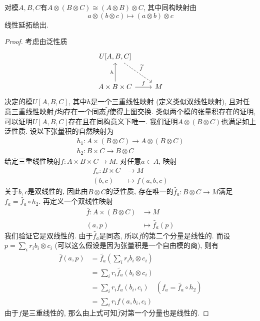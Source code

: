\begin{prop}[结合律]
    对模$A,B,C$有$A\otimes(B\otimes C)\cong(A\otimes B)\otimes C$, 其中同构映射由
    \[a\otimes(b\otimes c)\mapsto (a\otimes b)\otimes c\]
    线性延拓给出.
\end{prop}
\begin{proof}
    考虑由泛性质
    \[\begin{tikzcd}[row sep=large]
        U[A,B,C] \arrow[dr, dashed, "\widetilde{f}"] & \\
        A\times B\times C \arrow[u, "h"] \arrow[r, "f"] & M 
    \end{tikzcd}\]
    决定的模$U[A,B,C]$, 其中$h$是一个三重线性映射 (定义类似双线性映射), 且对任意三重线性映射$f$均存在一个同态$\widetilde{f}$使得上图交换.
    类似两个模的张量积存在的证明, 可以证明$U[A,B,C]$存在且在同构意义下唯一.
    我们证明$A\otimes(B\otimes C)$也满足如上泛性质.
    设以下张量积的自然映射为
    \begin{gather*}
        h_1:A\times(B\otimes C)\to A\otimes(B\otimes C)\\
        h_2:B\times C\to B\otimes C
    \end{gather*}
    给定三重线性映射$f:A\times B\times C\to M$.
    对任意$a\in A$, 映射
    \begin{align*}
        f_a:B\times C&\to M\\
        (b,c)&\mapsto f(a,b,c)
    \end{align*}
    关于$b,c$是双线性的, 因此由$B\otimes C$的泛性质, 存在唯一的$\widetilde{f_a}:B\otimes C\to M$满足$f_a=\widetilde{f_a}\circ h_2$.
    再定义一个双线性映射
    \begin{align*}
        \overline{f}:A\times(B\otimes C)&\to M\\
        (a,p)&\mapsto \widetilde{f_a}(p)
    \end{align*}
    我们验证它是双线性的.
    由于$\widetilde{f_a}$是同态, 所以$\overline{f}$的第二个分量是线性的.
    而设$\displaystyle p=\sum_{i}r_ib_i\otimes c_i$ (可以这么假设是因为张量积是一个自由模的商), 则有
    \begin{align*}
        \overline{f}(a,p)&=\widetilde{f_a}\left(\sum_{i}r_ib_i\otimes c_i\right)\\
        &=\sum_ir_i\widetilde{f_a}(b_i\otimes c_i)\\
        &=\sum_ir_if_a(b_i,c_i)\quad (f_a=\widetilde{f_a}\circ h_2)\\
        &=\sum_ir_if(a,b_i,c_i)
    \end{align*}
    由于$f$是三重线性的, 那么由上式可知$\overline{f}$对第一个分量也是线性的.

\end{proof}
